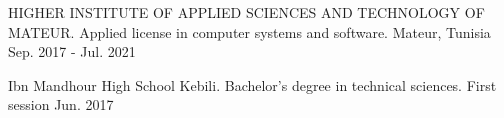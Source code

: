 

\begin{cventries}

  \cventry
  {HIGHER INSTITUTE OF APPLIED SCIENCES AND TECHNOLOGY OF MATEUR.} %
    {Applied license in computer systems and software.} %
    {Mateur, Tunisia} %
    {Sep. 2017 - Jul. 2021} %
    {}

    \cventry
    {Ibn Mandhour High School Kebili.} %
      {Bachelor's degree in technical sciences.} %
      {First session} %
      {Jun. 2017} %
      {}

\end{cventries}

